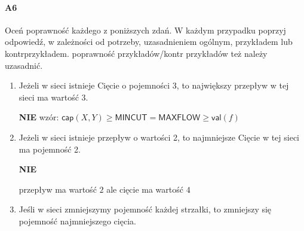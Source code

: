 \paragraph{A6} Oceń poprawność każdego z poniższych zdań. W każdym przypadku poprzyj odpowiedź, w zależności
od potrzeby, uzasadnieniem ogólnym, przykładem lub kontrprzykładem. poprawność przykładów/kontr przykładów też należy uzasadnić.
\begin{enumerate}[label=\alph*)]
\item Jeżeli w sieci istnieje Cięcie o pojemności 3, to największy przepływ w tej sieci ma wartość 3.

\textbf{NIE} wzór: $\mathsf{cap}(X,Y)\geq \mathsf{MINCUT}=\mathsf{MAXFLOW}\geq \mathsf{val}(f)$
\begin{figure}[H]
\centering
{}
\end{figure} 
\item Jeżeli w sieci istnieje przepływ o wartości 2, to najmniejsze Cięcie w tej sieci ma pojemność 2.

\textbf{NIE}
\begin{figure}[H]
\centering
{}
\end{figure} 
przepływ ma wartość $2$ ale cięcie ma wartość $4$
\item Jeśli w sieci zmniejszymy pojemność każdej strzałki, to zmniejszy się pojemność najmniejszego cięcia.


\end{enumerate}
